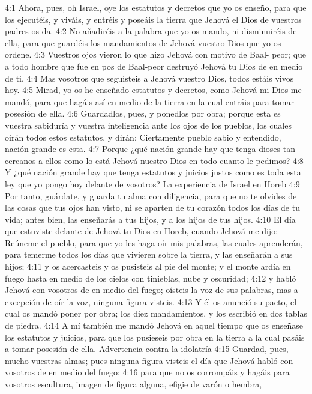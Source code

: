 4:1 Ahora, pues, oh Israel, oye los estatutos y decretos que yo os enseño, para que los ejecutéis, y viváis, y entréis y poseáis la tierra que Jehová el Dios de vuestros padres os da.  
4:2 No añadiréis a la palabra que yo os mando, ni disminuiréis de ella, para que guardéis los mandamientos de Jehová vuestro Dios que yo os ordene.  
4:3 Vuestros ojos vieron lo que hizo Jehová con motivo de Baal- peor; que a todo hombre que fue en pos de Baal-peor destruyó Jehová tu Dios de en medio de ti.  
4:4 Mas vosotros que seguisteis a Jehová vuestro Dios, todos estáis vivos hoy.  
4:5 Mirad, yo os he enseñado estatutos y decretos, como Jehová mi Dios me mandó, para que hagáis así en medio de la tierra en la cual entráis para tomar posesión de ella.  
4:6 Guardadlos, pues, y ponedlos por obra; porque esta es vuestra sabiduría y vuestra inteligencia ante los ojos de los pueblos, los cuales oirán todos estos estatutos, y dirán: Ciertamente pueblo sabio y entendido, nación grande es esta.  
4:7 Porque ¿qué nación grande hay que tenga dioses tan cercanos a ellos como lo está Jehová nuestro Dios en todo cuanto le pedimos?  
4:8 Y ¿qué nación grande hay que tenga estatutos y juicios justos como es toda esta ley que yo pongo hoy delante de vosotros?  
La experiencia de Israel en Horeb  
4:9 Por tanto, guárdate, y guarda tu alma con diligencia, para que no te olvides de las cosas que tus ojos han visto, ni se aparten de tu corazón todos los días de tu vida; antes bien, las enseñarás a tus hijos, y a los hijos de tus hijos.  
4:10 El día que estuviste delante de Jehová tu Dios en Horeb, cuando Jehová me dijo: Reúneme el pueblo, para que yo les haga oír mis palabras, las cuales aprenderán, para temerme todos los días que vivieren sobre la tierra, y las enseñarán a sus hijos;  
4:11 y os acercasteis y os pusisteis al pie del monte; y el monte ardía en fuego hasta en medio de los cielos con tinieblas, nube y oscuridad;  
4:12 y habló Jehová con vosotros de en medio del fuego; oísteis la voz de sus palabras, mas a excepción de oír la voz, ninguna figura visteis.  
4:13 Y él os anunció su pacto, el cual os mandó poner por obra; los diez mandamientos, y los escribió en dos tablas de piedra. 
4:14 A mí también me mandó Jehová en aquel tiempo que os enseñase los estatutos y juicios, para que los pusieseis por obra en la tierra a la cual pasáis a tomar posesión de ella.  
Advertencia contra la idolatría  
4:15 Guardad, pues, mucho vuestras almas; pues ninguna figura visteis el día que Jehová habló con vosotros de en medio del fuego;  
4:16 para que no os corrompáis y hagáis para vosotros escultura, imagen de figura alguna, efigie de varón o hembra,  
